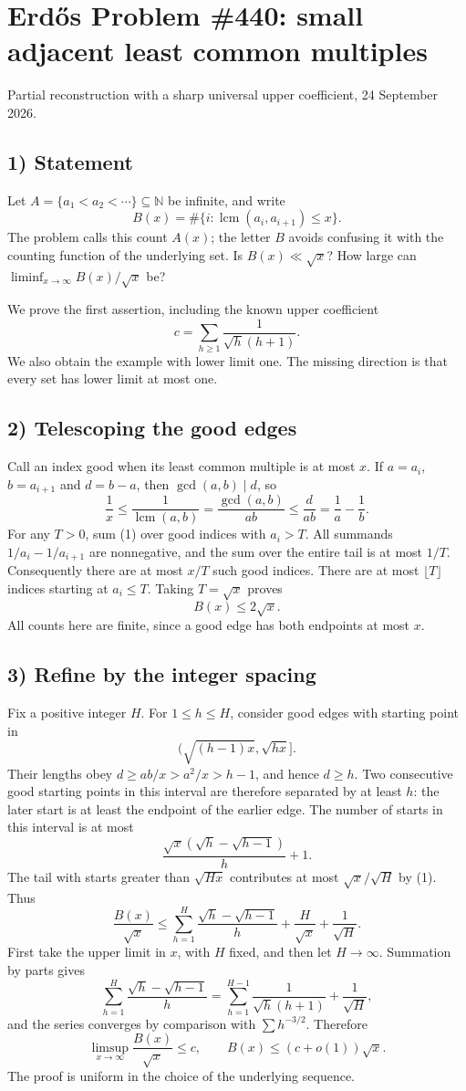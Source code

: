 \section{Erd\H{o}s Problem \#440: small adjacent least common multiples}
\noindent Partial reconstruction with a sharp universal upper coefficient, 24 September 2026.

\subsection*{1) Statement}
Let $A=\{a_1<a_2<\cdots\}\subseteq\mathbb N$ be infinite, and write
\[B(x)=\#\{i:\operatorname{lcm}(a_i,a_{i+1})\le x\}.\]
The problem calls this count $A(x)$; the letter $B$ avoids confusing it with the counting function of the underlying set. Is $B(x)\ll\sqrt x$? How large can $\liminf_{x\to\infty}B(x)/\sqrt x$ be?

We prove the first assertion, including the known upper coefficient
\[c=\sum_{h\ge1}\frac1{\sqrt h(h+1)}.\]
We also obtain the example with lower limit one. The missing direction is that every set has lower limit at most one.

\subsection*{2) Telescoping the good edges}
Call an index good when its least common multiple is at most $x$. If $a=a_i$, $b=a_{i+1}$ and $d=b-a$, then $\gcd(a,b)\mid d$, so
\[\frac1x\le\frac1{\operatorname{lcm}(a,b)}
=\frac{\gcd(a,b)}{ab}\le\frac d{ab}=\frac1a-\frac1b.\tag{1}\]
For any $T>0$, sum (1) over good indices with $a_i>T$. All summands $1/a_i-1/a_{i+1}$ are nonnegative, and the sum over the entire tail is at most $1/T$. Consequently there are at most $x/T$ such good indices. There are at most $\lfloor T\rfloor$ indices starting at $a_i\le T$. Taking $T=\sqrt x$ proves
\[B(x)\le2\sqrt x.\tag{2}\]
All counts here are finite, since a good edge has both endpoints at most $x$.

\subsection*{3) Refine by the integer spacing}
Fix a positive integer $H$. For $1\le h\le H$, consider good edges with starting point in
\[\big(\sqrt{(h-1)x},\sqrt{hx}\big].\]
Their lengths obey $d\ge ab/x>a^2/x>h-1$, and hence $d\ge h$. Two consecutive good starting points in this interval are therefore separated by at least $h$: the later start is at least the endpoint of the earlier edge. The number of starts in this interval is at most
\[\frac{\sqrt x(\sqrt h-\sqrt{h-1})}{h}+1.\]
The tail with starts greater than $\sqrt{Hx}$ contributes at most $\sqrt x/\sqrt H$ by (1). Thus
\[\frac{B(x)}{\sqrt x}\le
\sum_{h=1}^H\frac{\sqrt h-\sqrt{h-1}}h+\frac H{\sqrt x}+\frac1{\sqrt H}.\]
First take the upper limit in $x$, with $H$ fixed, and then let $H\to\infty$. Summation by parts gives
\[
\sum_{h=1}^H\frac{\sqrt h-\sqrt{h-1}}h
=\sum_{h=1}^{H-1}\frac1{\sqrt h(h+1)}+\frac1{\sqrt H},
\]
and the series converges by comparison with $\sum h^{-3/2}$. Therefore
\[\limsup_{x\to\infty}\frac{B(x)}{\sqrt x}\le c,
\qquad B(x)\le(c+o(1))\sqrt x.\tag{3}\]
The proof is uniform in the choice of the underlying sequence.

